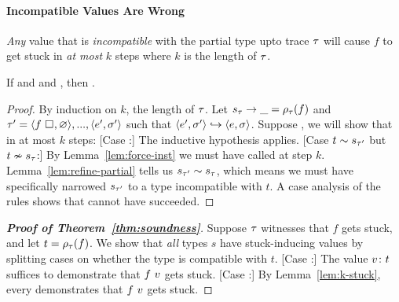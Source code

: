 \paragraph{Incompatible Values Are Wrong}
%
\emph{Any} value that is \emph{incompatible} with
the partial type upto trace $\tau$ will cause $f$ to get stuck
in \emph{at most} $k$ steps where $k$ is the length of $\tau$.
%
\begin{lem}
\label{lem:k-stuck}
  If  and
      and
     ,
  then
     .
\end{lem}
\begin{proof}
  By induction on $k$, the length of $\tau$.
  Let ${s_{\tau}} \rightarrow \_ = \rho_{\tau}(f)$ and
  $\tau' = \langle f \ \square_{}, \varnothing \rangle,...,\langle e', \sigma' \rangle$ 
  such that $\langle e', \sigma' \rangle \hookrightarrow \langle e, \sigma \rangle$.
  Suppose , we
  will show that 
  in at most $k$ steps:
%
  [Case :]
    The inductive hypothesis applies.
  [Case $t \sim s_{\tau'}$ but $t \nsim s_{\tau}$:]
    By Lemma~\ref{lem:force-inst} we must have called \forcesym at step
    $k$.
    Lemma~\ref{lem:refine-partial} tells us
    $s_{\tau'} \sim s_{\tau}$, which means we must have
    specifically narrowed $s_{\tau'}$ to a type incompatible with $t$.
    A case analysis of the rules shows that \forcesym cannot have
    succeeded.
\end{proof}

\begin{proof}[\textbf{Proof of Theorem~\ref{thm:soundness}}]
%
Suppose $\tau$ witnesses that $f$ gets stuck,
and let $t = \rho_{\tau}(f)$.
We show that \emph{all} types $s$ have stuck-inducing
values by splitting cases on whether the type is
compatible with $t$. %
%
  [Case :]
   The value ${v} \colon {t}$ suffices to demonstrate that $f \ v$
   gets stuck.
  [Case :]
   By Lemma~\ref{lem:k-stuck}, every  demonstrates that
   $f \ v$ gets stuck.
\end{proof}

